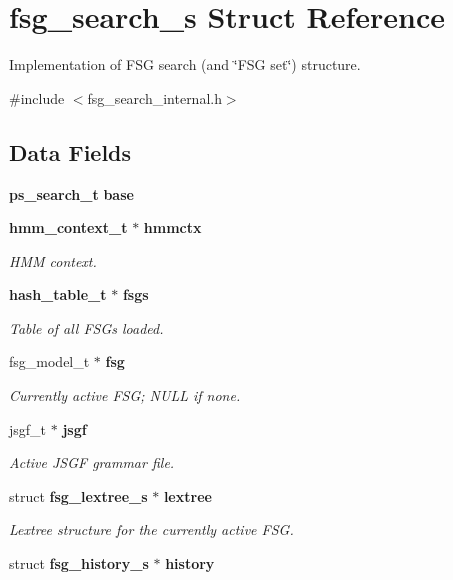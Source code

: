 \section{fsg\-\_\-search\-\_\-s Struct Reference}
\label{structfsg__search__s}


Implementation of F\-S\-G search (and \char`\"{}\-F\-S\-G set\char`\"{}) structure.  




{\ttfamily \#include $<$fsg\-\_\-search\-\_\-internal.\-h$>$}

\subsection*{Data Fields}
\begin{DoxyCompactItemize}
\item 
{\bf ps\-\_\-search\-\_\-t} {\bfseries base}\label{structfsg__search__s_a75f0e3fd5396d62616b9f84eab7ea355}

\item 
{\bf hmm\-\_\-context\-\_\-t} $\ast$ {\bf hmmctx}
\begin{DoxyCompactList}\small\item\em H\-M\-M context. \end{DoxyCompactList}\item 
{\bf hash\-\_\-table\-\_\-t} $\ast$ {\bf fsgs}\label{structfsg__search__s_a3d31a88c719aaf36ecae5c96ecddbd73}

\begin{DoxyCompactList}\small\item\em Table of all F\-S\-Gs loaded. \end{DoxyCompactList}\item 
fsg\-\_\-model\-\_\-t $\ast$ {\bf fsg}
\begin{DoxyCompactList}\small\item\em Currently active F\-S\-G; N\-U\-L\-L if none. \end{DoxyCompactList}\item 
jsgf\-\_\-t $\ast$ {\bf jsgf}
\begin{DoxyCompactList}\small\item\em Active J\-S\-G\-F grammar file. \end{DoxyCompactList}\item 
struct {\bf fsg\-\_\-lextree\-\_\-s} $\ast$ {\bf lextree}\label{structfsg__search__s_ac2c756ff6c1a2f1059011756d22441f8}

\begin{DoxyCompactList}\small\item\em Lextree structure for the currently active F\-S\-G. \end{DoxyCompactList}\item 
struct {\bf fsg\-\_\-history\-\_\-s} $\ast$ {\bf history}\label{structfsg__search__s_abc949ccaab380bcf5b452d1cac54469b}


\end{DoxyCompactItemize}

